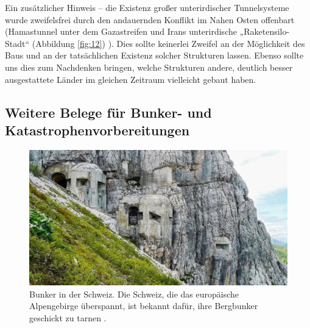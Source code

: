 \documentclass[10pt,twocolumn,letterpaper]{article}
\begin{document}
Ein zusätzlicher Hinweis – die Existenz großer unterirdischer Tunnelsysteme wurde zweifelsfrei durch den andauernden Konflikt im Nahen Osten offenbart (Hamastunnel unter dem Gazastreifen \cite{38} und Irans unterirdische „Raketensilo-Stadt“ (Abbildung \ref{fig:12}) \cite{39,40}). Dies sollte keinerlei Zweifel an der Möglichkeit des Baus und an der tatsächlichen Existenz solcher Strukturen lassen. Ebenso sollte uns dies zum Nachdenken bringen, welche Strukturen andere, deutlich besser ausgestattete Länder im gleichen Zeitraum vielleicht gebaut haben.

\subsection{Weitere Belege für Bunker- und Katastrophenvorbereitungen}

\begin{figure}[t]
\begin{center}
   \includegraphics[width=1\linewidth]{tyrol.jpg}
\end{center}
   \caption{Bunker in der Schweiz. Die Schweiz, die das europäische Alpengebirge überspannt, ist bekannt dafür, ihre Bergbunker geschickt zu tarnen \cite{32}.}
\label{fig:7}
\label{fig:onecol}
\end{figure}
\end{document}
